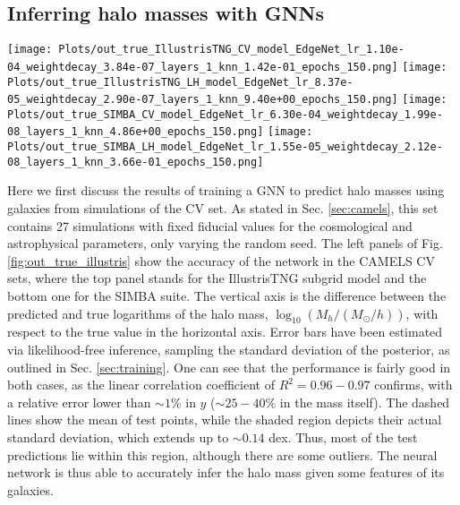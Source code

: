 \documentclass[twocolumn]{aastex631}
\begin{document}
\subsection{Inferring halo masses with GNNs}

\begin{figure*}[th!]
\begin{center}
\texttt{[image: Plots/out\_true\_IllustrisTNG\_CV\_model\_EdgeNet\_lr\_1.10e-04\_weightdecay\_3.84e-07\_layers\_1\_knn\_1.42e-01\_epochs\_150.png]}
\texttt{[image: Plots/out\_true\_IllustrisTNG\_LH\_model\_EdgeNet\_lr\_8.37e-05\_weightdecay\_2.90e-07\_layers\_1\_knn\_9.40e+00\_epochs\_150.png]}
\texttt{[image: Plots/out\_true\_SIMBA\_CV\_model\_EdgeNet\_lr\_6.30e-04\_weightdecay\_1.99e-08\_layers\_1\_knn\_4.86e+00\_epochs\_150.png]}
\texttt{[image: Plots/out\_true\_SIMBA\_LH\_model\_EdgeNet\_lr\_1.55e-05\_weightdecay\_2.12e-08\_layers\_1\_knn\_3.66e-01\_epochs\_150.png]}
\caption{Predicted versus true logarithm of halo masses $log_{10}\left[M_h/(M_\odot/h)\right]$ for the CV (left) and LH sets (right), training in the IllustrisTNG suite (top) and in SIMBA (bottom). A sample of 200 halos in the test dataset is shown in each case. Shaded regions and dashed lines correspond to real standard deviation and mean of test points, respectively. While in the CV set, astrophysical and cosmological parameters are fixed to fiducial values, the LH set comprises a broad range of astrophysical and cosmological scenarios. Even so, the GNN is still able to learn the halo/galaxy relation and predict masses in the LH case, only slightly worsening the prediction with respect to the CV case.}
\label{fig:out_true_illustris}
\end{center}
\end{figure*}

Here we first discuss the results of training a GNN to predict halo masses using galaxies from simulations of the CV set. As stated in Sec. \ref{sec:camels}, this set contains 27 simulations with fixed fiducial values for the cosmological and astrophysical parameters, only varying the random seed. The left panels of Fig. \ref{fig:out_true_illustris} show the accuracy of the network in the CAMELS CV sets, where the top panel stands for the IllustrisTNG subgrid model and the bottom one for the SIMBA suite. The vertical axis is the difference between the predicted and true logarithms of the halo mass, $\log_{10}\left(M_h/(M_\odot/h) \right)$, with respect to the true value in the horizontal axis. Error bars have been estimated via likelihood-free inference, sampling the standard deviation of the posterior, as outlined in Sec. \ref{sec:training}. One can see that the performance is fairly good in both cases, as the linear correlation coefficient of $R^2=0.96-0.97$ confirms, with a relative error lower than $\sim 1\%$ in $y$ ($\sim 25-40 \%$ in the mass itself). The dashed lines show the mean of test points, while the shaded region depicts their actual standard deviation, which extends up to $\sim 0.14$ dex. Thus, most of the test predictions lie within this region, although there are some outliers. The neural network is thus able to accurately infer the halo mass given some features of its galaxies.
\end{document}

